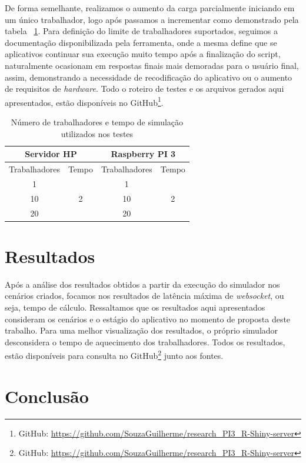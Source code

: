 \documentclass[12pt,english,brazil]{article}
\begin{document}

De forma semelhante, realizamos o aumento da carga parcialmente iniciando em um único trabalhador, logo após passamos a incrementar como demonstrado pela tabela ~\ref{tab:workers}. Para definição do limite de trabalhadores suportados, seguimos a documentação disponibilizada pela ferramenta, onde a mesma define que se aplicativos continuar sua execução muito tempo após a finalização do script, naturalmente ocasionam em respostas finais mais demoradas para o usuário final, assim, demonstrando a necessidade de recodificação do aplicativo ou o aumento de requisitos de \emph{hardware}. Todo o roteiro de testes e os arquivos gerados aqui apresentados, estão disponíveis no GitHub\footnote{GitHub: \url{https://github.com/SouzaGuilherme/research_PI3_R-Shiny-server}}.

\begin{table}[htbp]
\centering
\label{tab:workers}
\caption{Número de trabalhadores e tempo de simulação utilizados nos testes}
\begin{tabular}{c|c|cc}
\hline
\multicolumn{2}{c|}{\textbf{Servidor HP}} & \multicolumn{2}{c}{\textbf{Raspberry PI 3}}             \\ \hline
Trabalhadores     & Tempo                 & \multicolumn{1}{c|}{Trabalhadores} & Tempo              \\ \hline
1                 & \multirow{3}{*}{2}    & \multicolumn{1}{c|}{1}             & \multirow{3}{*}{2} \\ \cline{1-1} \cline{3-3}
10                &                       & \multicolumn{1}{c|}{10}            &                    \\ \cline{1-1} \cline{3-3}
20                &                       & \multicolumn{1}{c|}{20}            &                    \\ \hline
\end{tabular}
\end{table}

\section{Resultados} \label{sec:Resultados}
Após a análise dos resultados obtidos a partir da execução do simulador nos cenários criados, focamos nos resultados de latência máxima de \emph{websocket}, ou seja, tempo de cálculo. Ressaltamos que os resultados aqui apresentados consideram os cenários e o estágio do aplicativo no momento de proposta deste trabalho. Para uma melhor visualização dos resultados, o próprio simulador desconsidera o tempo de aquecimento dos trabalhadores. Todos os resultados, estão disponíveis para consulta no GitHub\footnote{GitHub: \url{https://github.com/SouzaGuilherme/research_PI3_R-Shiny-server}} junto aos fontes.

 

\section{Conclusão} \label{sec:conlusao}





\end{document}
